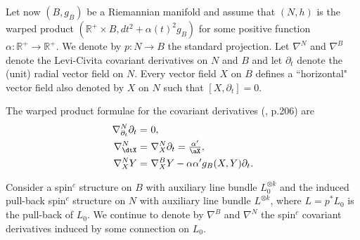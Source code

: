 \documentclass[12pt]{amsart}
\begin{document}
Let now $(B,g_B)$ be a Riemannian manifold and assume that $(N,h)$ is
the warped product $({{\mathbb R}}^+\times 
B,dt^2+{\alpha}(t)^2g_B)$ for some positive function ${\alpha}:{{\mathbb R}}^+\to {{\mathbb R}}^+$. We
denote by $p:N\to B$ the standard 
projection. Let ${\nabla}^N$ and ${\nabla}^B$ denote the Levi-Civita covariant
derivatives on 
$N$ and $B$ and let ${{\partial_t}}$ denote the (unit) radial vector field on
$N$. Every vector field $X$ on $B$ defines a ``horizontal" vector
field also denoted by $X$ on $N$ such that $[X,{{\partial_t}}]=0$.

The warped product formulae for the covariant derivatives
(\cite{ON83}, p.206) are
\begin{align} \label{pt1} {\nabla}^N_{{\partial_t}}{{\partial_t}}=&\ 0,\\
\label{pt2}{\nabla}^N_\dtX=&\ {\nabla}^N_X{{\partial_t}}=\tfrac{{\alpha}'}\aX,\\
\label{pt3} {\nabla}^N_XY=&\ {\nabla}^B_XY-{\alpha}{\alpha}'g_B(X,Y){{\partial_t}}.
\end{align} 

Consider a spin$^c$ structure on $B$ with auxiliary line bundle
$L_0^{\otimes k}$ and 
the induced pull-back spin$^c$ structure on $N$
with auxiliary line bundle $L^{\otimes k}$, where $L=p^*L_0$ is the
pull-back of $L_0$. We 
continue to denote by ${\nabla}^B$ and ${\nabla}^N$ the spin$^c$ covariant
derivatives induced by some connection on $L_0$.
\end{document}
